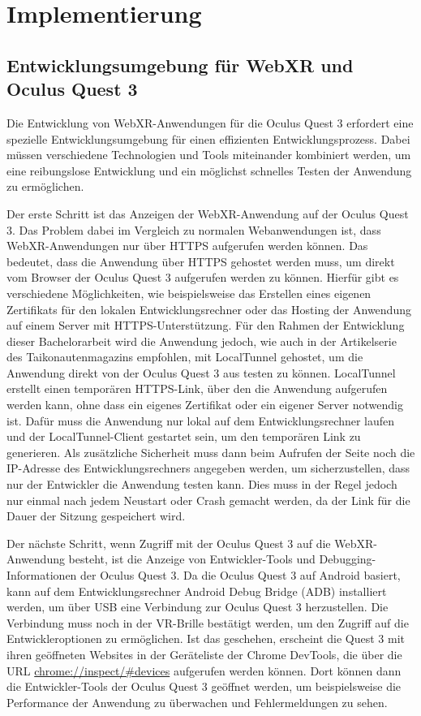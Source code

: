 \chapter{Implementierung}

\section{Entwicklungsumgebung für WebXR und Oculus Quest 3}

Die Entwicklung von WebXR-Anwendungen für die Oculus Quest 3 erfordert eine spezielle Entwicklungsumgebung für einen effizienten Entwicklungsprozess.
Dabei müssen verschiedene Technologien und Tools miteinander kombiniert werden, um eine reibungslose Entwicklung und ein möglichst schnelles Testen der Anwendung zu ermöglichen.

Der erste Schritt ist das Anzeigen der WebXR-Anwendung auf der Oculus Quest 3.
Das Problem dabei im Vergleich zu \glqq{}normalen\grqq{} Webanwendungen ist, dass WebXR-Anwendungen nur über HTTPS aufgerufen werden können.
Das bedeutet, dass die Anwendung über HTTPS gehostet werden muss, um direkt vom Browser der Oculus Quest 3 aufgerufen werden zu können.
Hierfür gibt es verschiedene Möglichkeiten, wie beispielsweise das Erstellen eines eigenen Zertifikats für den lokalen Entwicklungsrechner oder das Hosting der Anwendung auf einem Server mit HTTPS-Unterstützung.
Für den Rahmen der Entwicklung dieser Bachelorarbeit wird die Anwendung jedoch, wie auch in der Artikelserie des Taikonautenmagazins \autocite[Part 0/8]{taikonauten-magazine} empfohlen, mit LocalTunnel gehostet, um die Anwendung direkt von der Oculus Quest 3 aus testen zu können.
LocalTunnel erstellt einen temporären HTTPS-Link, über den die Anwendung aufgerufen werden kann, ohne dass ein eigenes Zertifikat oder ein eigener Server notwendig ist.
Dafür muss die Anwendung nur lokal auf dem Entwicklungsrechner laufen und der LocalTunnel-Client gestartet sein, um den temporären Link zu generieren.
Als zusätzliche Sicherheit muss dann beim Aufrufen der Seite noch die IP-Adresse des Entwicklungsrechners angegeben werden, um sicherzustellen, dass nur der Entwickler die Anwendung testen kann.
Dies muss in der Regel jedoch nur einmal nach jedem Neustart oder Crash gemacht werden, da der Link für die Dauer der Sitzung gespeichert wird.

Der nächste Schritt, wenn Zugriff mit der Oculus Quest 3 auf die WebXR-Anwendung besteht, ist die Anzeige von Entwickler-Tools und Debugging-Informationen der Oculus Quest 3.
Da die Oculus Quest 3 auf Android basiert, kann auf dem Entwicklungsrechner Android Debug Bridge (ADB) installiert werden, um über USB eine Verbindung zur Oculus Quest 3 herzustellen.
Die Verbindung muss noch in der VR-Brille bestätigt werden, um den Zugriff auf die Entwickleroptionen zu ermöglichen.
Ist das geschehen, erscheint die Quest 3 mit ihren geöffneten Websites in der Geräteliste der Chrome DevTools, die über die URL \url{chrome://inspect/#devices} aufgerufen werden können.
Dort können dann die Entwickler-Tools der Oculus Quest 3 geöffnet werden, um beispielsweise die Performance der Anwendung zu überwachen und Fehlermeldungen zu sehen.



